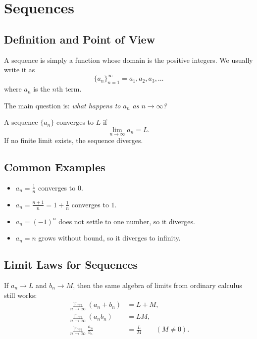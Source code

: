 \chapter*{Sequences}

\section*{Definition and Point of View}

A sequence is simply a function whose domain is the positive integers. We usually write it as
$$\{a_n\}_{n=1}^{\infty} = a_1,a_2,a_3,\dots$$
where $a_n$ is the $n$th term.

The main question is: \emph{what happens to $a_n$ as $n\to\infty$?}

\begin{definition}
A sequence $\{a_n\}$ converges to $L$ if
$$\lim_{n\to\infty} a_n = L.$$ 
If no finite limit exists, the sequence diverges.
\end{definition}

\section*{Common Examples}

\begin{itemize}
    \item $a_n=\frac{1}{n}$ converges to $0$.
    \item $a_n=\frac{n+1}{n}=1+\frac{1}{n}$ converges to $1$.
    \item $a_n=(-1)^n$ does not settle to one number, so it diverges.
    \item $a_n=n$ grows without bound, so it diverges to infinity.
\end{itemize}

\section*{Limit Laws for Sequences}

If $a_n\to L$ and $b_n\to M$, then the same algebra of limits from ordinary calculus still works:
\begin{align*}
\lim_{n\to\infty}(a_n+b_n) &= L+M, \\
\lim_{n\to\infty}(a_n b_n) &= LM, \\
\lim_{n\to\infty}\frac{a_n}{b_n} &= \frac{L}{M} \qquad (M\neq 0).
\end{align*}

